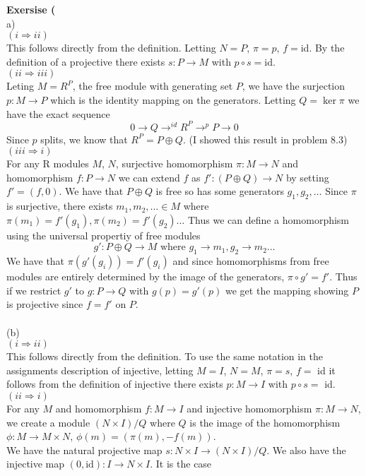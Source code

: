 \documentclass[12pt]{article}
\newenvironment{ques}[1]{\textbf{Exersise #1}\vspace{1 mm}\\ }{\bigskip}
\theoremstyle{definition}
\newcommand{\id}{\text{id}}
\begin{document}
\begin{ques}{8.5}
	(a) \\
	$(i \Rightarrow ii)$\\
	This follows directly from the definition. Letting $N = P$, $\pi = p$, $f =
	$id. By the definition of a projective there exists $s: P \to M$ with $p
	\circ s = $id.\\
	$(ii \Rightarrow iii)$\\
	Leting $M= R^P$, the free module with generating set $P$, we have the
	surjection $p:M \to P$ which is the identity mapping on the generators.
	Letting $Q = \ker \pi$ we have the exact sequence
	$$0 \to Q \to^{id}  R^P \to^{p} P \to 0$$
	Since $p$ splits, we know that $R^P = P \oplus Q$. (I showed this result in
	problem 8.3)
	\\
	$(iii \Rightarrow i)$\\
	For any R modules $M$, $N$, surjective homomorphism $\pi : M \to N$ and
	homomorphism $f: P \to N$ we can extend $f$ as $f':(P \oplus Q) \to N$ by
	setting $f' = (f,0)$. We have that $P \oplus Q$ is free so has some
	generators $g_1, g_2,
	\dots$ Since $\pi$ is surjective, there exists $m_1, m_2, \dots \in M$
	where $\pi(m_1) = f'(g_1), \pi(m_2) = f'(g_2) \dots $ Thus we can define a
	homomorphism using the universal propertiy of free modules
	$$g': P \oplus Q \to M \text{ where } g_1 \to m_1, g_2 \to m_2 \dots$$
	We have that $\pi(g'(g_i)) = f'(g_i)$ and since homomorphisms from free
	modules are entirely determined by the image of the generators, $\pi \circ
	g' = f'$. Thus if we restrict $g'$ to $g: P \to Q$ with $g(p)
	= g'(p)$ we get the mapping showing $P$ is projective since $f = f'$ on $P$.\\
	\\
	(b) \\
	$(i \Rightarrow ii)$\\
	This follows directly from the definition. To use the same notation in the
	assignments description of injective, letting $M = I$, $N = M$, $\pi = s$, $f =
	$ id it follows from the definition of injective there exists $p: M \to I$ with $p
	\circ s = $ id.\\
	$(ii \Rightarrow i)$\\
	For any $M$  and homomorphism $f:M \to I$ and injective homomorphism $\pi:M
	\to N$, we create a module $(N \times I)/Q$ where $Q$ is the image of the
	homomorphism $\phi: M  \to M \times N$, $\phi(m) = (\pi(m), -f(m))$.\\
	We have the natural projective map $s:N \times I \to (N \times I)/Q$.
	We also have the injective map $(0,\id):I \to N \times I$. It is the case

\end{ques}
\end{document}
